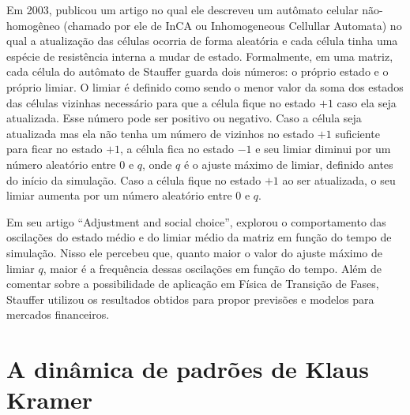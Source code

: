 \documentclass[
	12pt,				%
	openright,			%
	twoside,			%
	a4paper,			%
	english,			%
	french,				%
	spanish,			%
	brazil				%
	]{abntex2}
\begin{document}
Em 2003,  publicou um artigo no qual ele descreveu um autômato celular não-homogêneo (chamado por ele de InCA ou Inhomogeneous Cellullar Automata) no qual a atualização das células ocorria de forma aleatória e cada célula tinha uma espécie de resistência interna a mudar de estado. Formalmente, em uma matriz, cada célula do autômato de Stauffer guarda dois números: o próprio estado e o próprio limiar. O limiar é definido como sendo o menor valor da soma dos estados das células vizinhas necessário para que a célula fique no estado $+1$ caso ela seja atualizada. Esse número pode ser positivo ou negativo. Caso a célula seja atualizada mas ela não tenha um número de vizinhos no estado $+1$ suficiente para ficar no estado $+1$, a célula fica no estado $-1$ e seu limiar diminui por um número aleatório entre $0$ e $q$, onde $q$ é o ajuste máximo de limiar, definido antes do início da simulação. Caso a célula fique no estado $+1$ ao ser atualizada, o seu limiar aumenta por um número aleatório entre $0$ e $q$.

Em seu artigo ``Adjustment and social choice'',  explorou o comportamento das oscilações do estado médio e do limiar médio da matriz em função do tempo de simulação. Nisso ele percebeu que, quanto maior o valor do ajuste máximo de limiar $q$, maior é a frequência dessas oscilações em função do tempo. Além de comentar sobre a possibilidade de aplicação em Física de Transição de Fases, Stauffer utilizou os resultados obtidos para propor previsões e modelos para mercados financeiros.

\section*{A dinâmica de padrões de Klaus Kramer}
\end{document}
